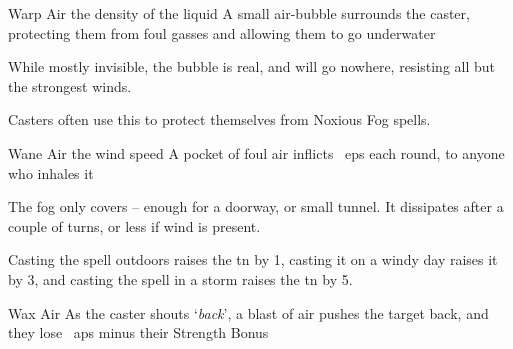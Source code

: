 \ifodd\value{diceNo}

  {}%
  {Warp}%
  {Air}%
  {the density of the liquid}%
  {A small air-bubble surrounds the caster, protecting them from foul gasses and allowing them to go underwater}%
  {While mostly invisible, the bubble is real, and will go nowhere, resisting all but the strongest winds.

    Casters often use this to protect themselves from Noxious Fog spells.}

  {}%
  {Wane}%
  {Air}%
  {the wind speed}%
  {A pocket of foul air inflicts ~\glspl{ep} each round, to anyone who inhales it}%
  {
    The fog only covers  -- enough for a doorway, or small tunnel.
    It dissipates after a couple of turns, or less if wind is present.

    Casting the spell outdoors raises the \gls{tn} by 1, casting it on a windy day raises it by 3, and casting the spell in a storm raises the \gls{tn} by 5.
  }

\else

  {}%
  {Wax}%
  {Air}%
  {}%
  {As the caster shouts `\textit{back}', a blast of air pushes the target back, and they lose ~\glspl{ap} minus their Strength Bonus}%
  {}

\fi
{}
